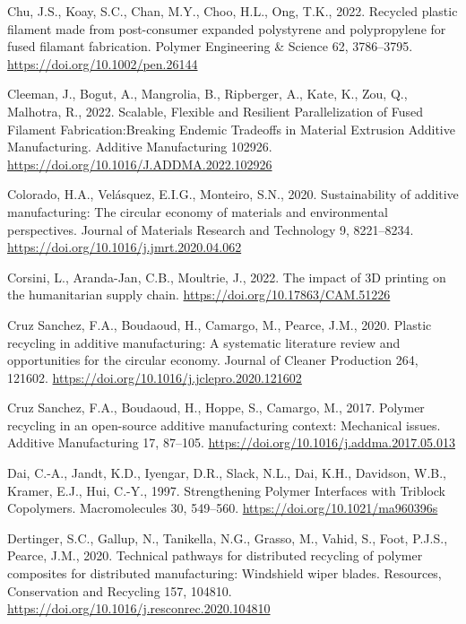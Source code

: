 \documentclass[
  12pt,
]{article}
\newlength{\cslhangindent}
\newlength{\cslentryspacingunit} %
\newenvironment{CSLReferences}[2] %
 {%
  \setlength{\parindent}{0pt}
  \ifodd #1
  \let\oldpar\par
  \def\par{\hangindent=\cslhangindent\oldpar}
  \fi
  \setlength{\parskip}{#2\cslentryspacingunit}
 }%
 {}
\begin{document}
\begin{CSLReferences}{1}{0}
\leavevmode{}%
Chu, J.S., Koay, S.C., Chan, M.Y., Choo, H.L., Ong, T.K., 2022. Recycled
plastic filament made from post-consumer expanded polystyrene and
polypropylene for fused filamant fabrication. Polymer Engineering \&
Science 62, 3786--3795. \url{https://doi.org/10.1002/pen.26144}

\leavevmode{}%
Cleeman, J., Bogut, A., Mangrolia, B., Ripberger, A., Kate, K., Zou, Q.,
Malhotra, R., 2022. Scalable, {Flexible} and {Resilient Parallelization}
of {Fused Filament Fabrication}:{Breaking Endemic Tradeoffs} in
{Material Extrusion Additive Manufacturing}. Additive Manufacturing
102926. \url{https://doi.org/10.1016/J.ADDMA.2022.102926}

\leavevmode{}%
Colorado, H.A., Velásquez, E.I.G., Monteiro, S.N., 2020. Sustainability
of additive manufacturing: The circular economy of materials and
environmental perspectives. Journal of Materials Research and Technology
9, 8221--8234. \url{https://doi.org/10.1016/j.jmrt.2020.04.062}

\leavevmode{}%
Corsini, L., Aranda-Jan, C.B., Moultrie, J., 2022. The impact of {3D}
printing on the humanitarian supply chain.
\url{https://doi.org/10.17863/CAM.51226}

\leavevmode{}%
Cruz Sanchez, F.A., Boudaoud, H., Camargo, M., Pearce, J.M., 2020.
Plastic recycling in additive manufacturing: {A} systematic literature
review and opportunities for the circular economy. Journal of Cleaner
Production 264, 121602.
\url{https://doi.org/10.1016/j.jclepro.2020.121602}

\leavevmode{}%
Cruz Sanchez, F.A., Boudaoud, H., Hoppe, S., Camargo, M., 2017. Polymer
recycling in an open-source additive manufacturing context: {Mechanical}
issues. Additive Manufacturing 17, 87--105.
\url{https://doi.org/10.1016/j.addma.2017.05.013}

\leavevmode{}%
Dai, C.-A., Jandt, K.D., Iyengar, D.R., Slack, N.L., Dai, K.H.,
Davidson, W.B., Kramer, E.J., Hui, C.-Y., 1997. Strengthening {Polymer
Interfaces} with {Triblock Copolymers}. Macromolecules 30, 549--560.
\url{https://doi.org/10.1021/ma960396s}

\leavevmode{}%
Dertinger, S.C., Gallup, N., Tanikella, N.G., Grasso, M., Vahid, S.,
Foot, P.J.S., Pearce, J.M., 2020. Technical pathways for distributed
recycling of polymer composites for distributed manufacturing:
{Windshield} wiper blades. Resources, Conservation and Recycling 157,
104810. \url{https://doi.org/10.1016/j.resconrec.2020.104810}


\end{CSLReferences}
\end{document}
